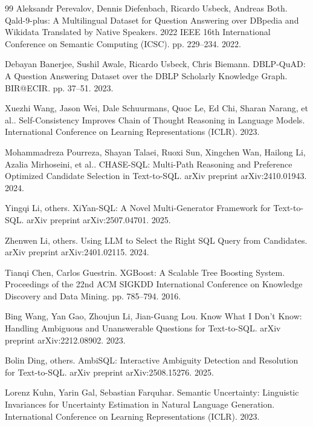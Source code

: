 \documentclass[
  12pt,
  english,
  oneside]{report}
\begin{document}
\begin{thebibliography}{99}
Aleksandr Perevalov, Dennis Diefenbach, Ricardo Usbeck, Andreas Both. {Qald-9-plus}: A Multilingual Dataset for Question Answering over {DBpedia} and {Wikidata} Translated by Native Speakers. 2022 IEEE 16th International Conference on Semantic Computing (ICSC). pp. 229--234. 2022.

Debayan Banerjee, Sushil Awale, Ricardo Usbeck, Chris Biemann. {DBLP-QuAD}: A Question Answering Dataset over the {DBLP} Scholarly Knowledge Graph. BIR@ECIR. pp. 37--51. 2023.

Xuezhi Wang, Jason Wei, Dale Schuurmans, Quoc Le, Ed Chi, Sharan Narang, et al.. Self-Consistency Improves Chain of Thought Reasoning in Language Models. International Conference on Learning Representations (ICLR). 2023.

Mohammadreza Pourreza, Shayan Talaei, Ruoxi Sun, Xingchen Wan, Hailong Li, Azalia Mirhoseini, et al.. {CHASE-SQL}: Multi-Path Reasoning and Preference Optimized Candidate Selection in Text-to-{SQL}. arXiv preprint arXiv:2410.01943. 2024.

Yingqi Li, others. {XiYan-SQL}: A Novel Multi-Generator Framework for Text-to-{SQL}. arXiv preprint arXiv:2507.04701. 2025.

Zhenwen Li, others. Using {LLM} to Select the Right {SQL} Query from Candidates. arXiv preprint arXiv:2401.02115. 2024.

Tianqi Chen, Carlos Guestrin. {XGBoost}: A Scalable Tree Boosting System. Proceedings of the 22nd ACM SIGKDD International Conference on Knowledge Discovery and Data Mining. pp. 785--794. 2016.

Bing Wang, Yan Gao, Zhoujun Li, Jian-Guang Lou. Know What {I} Don't Know: Handling Ambiguous and Unanswerable Questions for Text-to-{SQL}. arXiv preprint arXiv:2212.08902. 2023.

Bolin Ding, others. {AmbiSQL}: Interactive Ambiguity Detection and Resolution for Text-to-{SQL}. arXiv preprint arXiv:2508.15276. 2025.

Lorenz Kuhn, Yarin Gal, Sebastian Farquhar. Semantic Uncertainty: Linguistic Invariances for Uncertainty Estimation in Natural Language Generation. International Conference on Learning Representations (ICLR). 2023.


\end{thebibliography}
\end{document}

